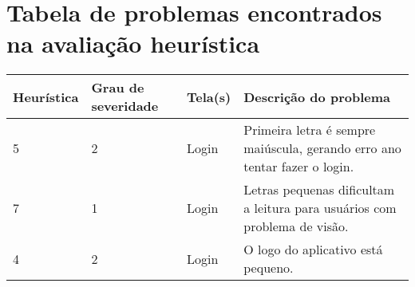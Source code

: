 \appendix

\chapter{Tabela de problemas encontrados na avaliação heurística}
\label{sec:tabela_av_heuristica}

\begingroup
\renewcommand{\arraystretch}{0.1} %
\begin{table}[H]
\centering
\centering
\footnotesize
\begin{tabular}{p{1.5cm} p{2cm} p{4cm} p{8.5cm}}
\toprule
\textbf{Heurística} & \textbf{Grau de severidade} & \textbf{Tela(s)} & \textbf{Descrição do problema}       
\\ \midrule
5
& 
2
&
Login
&
Primeira letra é sempre maiúscula, gerando erro ano tentar fazer o login.
\\ \midrule
7
& 
1
&
Login
&
Letras pequenas dificultam a leitura para usuários com problema de visão.
\\ \midrule
4
& 
2
&
Login
&
O logo do aplicativo está pequeno.
\\ \midrule


\end{tabular}
\end{table}
